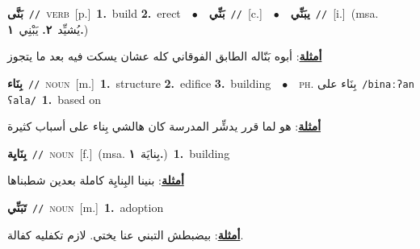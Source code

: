 \documentclass[10pt,a4paper,twoside]{article} %
\begin{document}
\begin{multicols}{2}
{\setlength\topsep{0pt}\textbf{\foreignlanguage{arabic}{بَنَّى}}\ {\color{gray}\texttt{//}\color{black}}\ \textsc{verb}\ [p.]\ \textbf{1.}~build  \textbf{2.}~erect\ \ $\bullet$\ \ \setlength\topsep{0pt}\textbf{\foreignlanguage{arabic}{بَنِّي}}\ {\color{gray}\texttt{//}\color{black}}\ [c.]\ \ $\bullet$\ \ \setlength\topsep{0pt}\textbf{\foreignlanguage{arabic}{يبَنِّي}}\ {\color{gray}\texttt{//}\color{black}}\ [i.]\ \color{gray}(msa. \foreignlanguage{arabic}{يُشيِّد}~\foreignlanguage{arabic}{\textbf{٢.}}  \foreignlanguage{arabic}{يَبْنِي}~\foreignlanguage{arabic}{\textbf{١.}})\color{black}\  \begin{flushright}\color{gray}\foreignlanguage{arabic}{\textbf{\underline{\foreignlanguage{arabic}{أمثلة}}}: أبوه بَنّاله الطابق الفوقاني كله عشان يسكت فيه بعد ما يتجوز}\end{flushright}\color{black}} \vspace{2mm}

{\setlength\topsep{0pt}\textbf{\foreignlanguage{arabic}{بِنَاء}}\ {\color{gray}\texttt{//}\color{black}}\ \textsc{noun}\ [m.]\ \textbf{1.}~structure  \textbf{2.}~edifice  \textbf{3.}~building\ \ $\bullet$\ \ \textsc{ph.} \color{gray} \foreignlanguage{arabic}{بِنَاء على}\color{black}\ {\color{gray}\texttt{/{\sffamily binaːʔan ʕala}/}\color{black}}\ \textbf{1.}~based on\  \begin{flushright}\color{gray}\foreignlanguage{arabic}{\textbf{\underline{\foreignlanguage{arabic}{أمثلة}}}: هو لما قرر يدشِّر المدرسة كان هالشي بِناء على أسباب كثيرة}\end{flushright}\color{black}} \vspace{2mm}

{\setlength\topsep{0pt}\textbf{\foreignlanguage{arabic}{بِنَايِة}}\ {\color{gray}\texttt{//}\color{black}}\ \textsc{noun}\ [f.]\ \color{gray}(msa. \foreignlanguage{arabic}{بِنايَة}~\foreignlanguage{arabic}{\textbf{١.}})\color{black}\ \textbf{1.}~building\  \begin{flushright}\color{gray}\foreignlanguage{arabic}{\textbf{\underline{\foreignlanguage{arabic}{أمثلة}}}: بنينا البِنايِة كاملة بعدين شطبناها}\end{flushright}\color{black}} \vspace{2mm}

{\setlength\topsep{0pt}\textbf{\foreignlanguage{arabic}{تَبَنِّي}}\ {\color{gray}\texttt{//}\color{black}}\ \textsc{noun}\ [m.]\ \textbf{1.}~adoption\  \begin{flushright}\color{gray}\foreignlanguage{arabic}{\textbf{\underline{\foreignlanguage{arabic}{أمثلة}}}: بيضبطش التبني عنا يختي. لازم تكفليه كفالة.}\end{flushright}\color{black}} \vspace{2mm}


\end{multicols}
\end{document}

